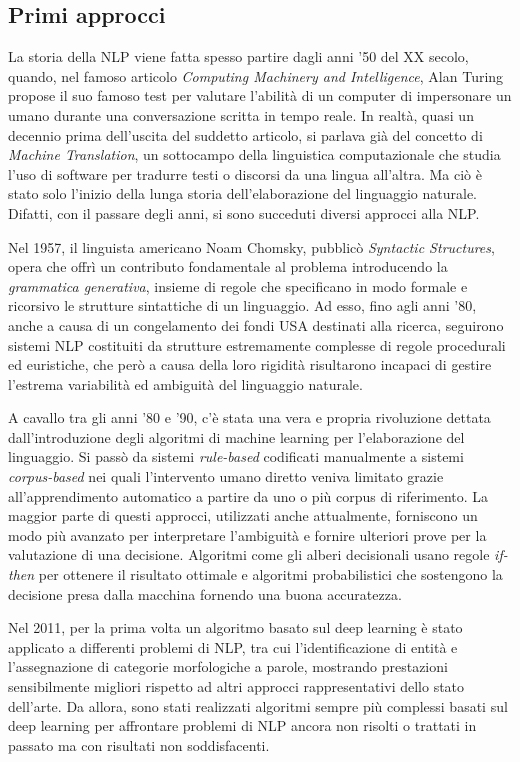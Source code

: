 \subsection{Primi approcci}
La storia della NLP viene fatta spesso partire dagli anni '50 del XX secolo, quando, nel famoso articolo \textit{Computing Machinery and Intelligence}\textsuperscript{\cite{10.1093/mind/LIX.236.433}}, Alan Turing propose il suo famoso test per valutare l'abilità di un computer di impersonare un umano durante una conversazione scritta in tempo reale. In realtà, quasi un decennio prima dell'uscita del suddetto articolo, si parlava già del concetto di \textit{Machine Translation}, un sottocampo della linguistica computazionale che studia l'uso di software per tradurre testi o discorsi da una lingua all'altra. Ma ciò è stato solo l'inizio della lunga storia dell'elaborazione del linguaggio naturale. Difatti, con il passare degli anni, si sono succeduti diversi approcci alla NLP. 

Nel 1957, il linguista americano Noam Chomsky, pubblicò \textit{Syntactic Structures}\textsuperscript{\cite{chomsky2002syntactic}}, opera che offrì un contributo fondamentale al problema introducendo la \textit{grammatica generativa}, insieme di regole che specificano in modo formale e ricorsivo le strutture sintattiche di un linguaggio. Ad esso, fino agli anni '80, anche a causa di un congelamento dei fondi USA destinati alla ricerca, seguirono sistemi NLP costituiti da strutture estremamente complesse di regole procedurali ed euristiche, che però a causa della loro rigidità risultarono incapaci di gestire l'estrema variabilità ed ambiguità del linguaggio naturale.

A cavallo tra gli anni '80 e '90, c'è stata una vera e propria rivoluzione dettata dall'introduzione degli algoritmi di machine learning per l'elaborazione del linguaggio. Si passò da sistemi \textit{rule-based} codificati manualmente a sistemi \textit{corpus-based} nei quali l'intervento umano diretto veniva limitato grazie all'apprendimento automatico a partire da uno o più corpus di riferimento. La maggior parte di questi approcci, utilizzati anche attualmente, forniscono un modo più avanzato per interpretare l'ambiguità e fornire ulteriori prove per la valutazione di una decisione. Algoritmi come gli alberi decisionali usano regole \textit{if-then} per ottenere il risultato ottimale e algoritmi probabilistici che sostengono la decisione presa dalla macchina fornendo una buona accuratezza.

Nel 2011, per la prima volta un algoritmo basato sul deep learning è stato applicato a differenti problemi di NLP, tra cui l’identificazione di entità e l’assegnazione di categorie morfologiche a parole, mostrando prestazioni sensibilmente migliori rispetto ad altri approcci rappresentativi dello stato dell’arte. Da allora, sono stati realizzati algoritmi sempre più complessi basati sul deep learning per affrontare problemi di NLP ancora non risolti o trattati in passato ma con risultati non soddisfacenti. 

